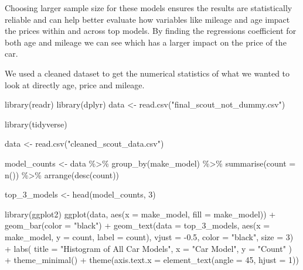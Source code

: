 \documentclass[
  letterpaper,
  DIV=11,
  numbers=noendperiod]{scrartcl}
\newenvironment{Shaded}{\begin{snugshade}}{\end{snugshade}}
\newcommand{\AttributeTok}[1]{\textcolor[rgb]{0.40,0.45,0.13}{#1}}
\newcommand{\DecValTok}[1]{\textcolor[rgb]{0.68,0.00,0.00}{#1}}
\newcommand{\FloatTok}[1]{\textcolor[rgb]{0.68,0.00,0.00}{#1}}
\newcommand{\FunctionTok}[1]{\textcolor[rgb]{0.28,0.35,0.67}{#1}}
\newcommand{\NormalTok}[1]{\textcolor[rgb]{0.00,0.23,0.31}{#1}}
\newcommand{\OtherTok}[1]{\textcolor[rgb]{0.00,0.23,0.31}{#1}}
\newcommand{\SpecialCharTok}[1]{\textcolor[rgb]{0.37,0.37,0.37}{#1}}
\newcommand{\StringTok}[1]{\textcolor[rgb]{0.13,0.47,0.30}{#1}}
\begin{document}
Choosing larger sample size for these models ensures the results are
statistically reliable and can help better evaluate how variables like
mileage and age impact the prices within and across top models. By
finding the regressions coefficient for both age and mileage we can see
which has a larger impact on the price of the car.

We used a cleaned dataset to get the numerical statistics of what we
wanted to look at directly age, price and mileage.

\begin{Shaded}
\begin{Highlighting}[]
\FunctionTok{library}\NormalTok{(readr)}
\FunctionTok{library}\NormalTok{(dplyr)}
\NormalTok{data }\OtherTok{\textless{}{-}} \FunctionTok{read.csv}\NormalTok{(}\StringTok{"final\_scout\_not\_dummy.csv"}\NormalTok{)}

\FunctionTok{library}\NormalTok{(tidyverse)}

\NormalTok{data }\OtherTok{\textless{}{-}} \FunctionTok{read.csv}\NormalTok{(}\StringTok{"cleaned\_scout\_data.csv"}\NormalTok{)}

\NormalTok{model\_counts }\OtherTok{\textless{}{-}}\NormalTok{ data }\SpecialCharTok{\%\textgreater{}\%} 
  \FunctionTok{group\_by}\NormalTok{(make\_model) }\SpecialCharTok{\%\textgreater{}\%} 
  \FunctionTok{summarise}\NormalTok{(}\AttributeTok{count =} \FunctionTok{n}\NormalTok{()) }\SpecialCharTok{\%\textgreater{}\%} 
  \FunctionTok{arrange}\NormalTok{(}\FunctionTok{desc}\NormalTok{(count))}

\NormalTok{top\_3\_models }\OtherTok{\textless{}{-}} \FunctionTok{head}\NormalTok{(model\_counts, }\DecValTok{3}\NormalTok{)}

\FunctionTok{library}\NormalTok{(ggplot2)}
\FunctionTok{ggplot}\NormalTok{(data, }\FunctionTok{aes}\NormalTok{(}\AttributeTok{x =}\NormalTok{ make\_model, }\AttributeTok{fill =}\NormalTok{ make\_model)) }\SpecialCharTok{+}
  \FunctionTok{geom\_bar}\NormalTok{(}\AttributeTok{color =} \StringTok{"black"}\NormalTok{) }\SpecialCharTok{+}
  \FunctionTok{geom\_text}\NormalTok{(}\AttributeTok{data =}\NormalTok{ top\_3\_models, }\FunctionTok{aes}\NormalTok{(}\AttributeTok{x =}\NormalTok{ make\_model, }\AttributeTok{y =}\NormalTok{ count, }\AttributeTok{label =}\NormalTok{ count), }
            \AttributeTok{vjust =} \SpecialCharTok{{-}}\FloatTok{0.5}\NormalTok{, }\AttributeTok{color =} \StringTok{"black"}\NormalTok{, }\AttributeTok{size =} \DecValTok{3}\NormalTok{) }\SpecialCharTok{+}
  \FunctionTok{labs}\NormalTok{(}
    \AttributeTok{title =} \StringTok{"Histogram of All Car Models"}\NormalTok{,}
    \AttributeTok{x =} \StringTok{"Car Model"}\NormalTok{,}
    \AttributeTok{y =} \StringTok{"Count"}
\NormalTok{  ) }\SpecialCharTok{+}
  \FunctionTok{theme\_minimal}\NormalTok{() }\SpecialCharTok{+}
  \FunctionTok{theme}\NormalTok{(}\AttributeTok{axis.text.x =} \FunctionTok{element\_text}\NormalTok{(}\AttributeTok{angle =} \DecValTok{45}\NormalTok{, }\AttributeTok{hjust =} \DecValTok{1}\NormalTok{))}



\end{Highlighting}
\end{Shaded}
\end{document}

